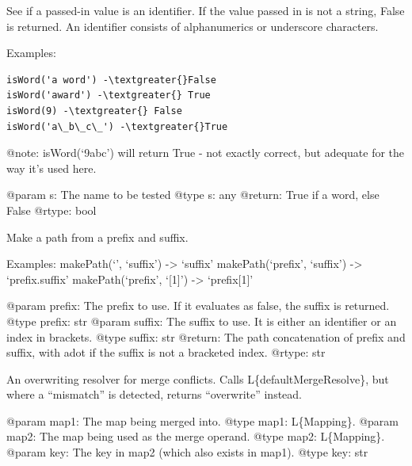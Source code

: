 \documentclass[a4paper,10pt,english]{sphinxmanual}
\begin{document}

\begin{fulllineitems}
\label{commands/apidoc/src:src.pyconf.isWord}
See if a passed-in value is an identifier. If the value passed in is not a
string, False is returned. An identifier consists of alphanumerics or
underscore characters.

Examples:

\begin{Verbatim}[commandchars=\\\{\}]
isWord('a word') -\textgreater{}False
isWord('award') -\textgreater{} True
isWord(9) -\textgreater{} False
isWord('a\_b\_c\_') -\textgreater{}True
\end{Verbatim}

@note: isWord(`9abc') will return True - not exactly correct, but adequate
for the way it's used here.

@param s: The name to be tested
@type s: any
@return: True if a word, else False
@rtype: bool

\end{fulllineitems}


\begin{fulllineitems}
\label{commands/apidoc/src:src.pyconf.makePath}
Make a path from a prefix and suffix.

Examples:
makePath(`', `suffix') -\textgreater{} `suffix'
makePath(`prefix', `suffix') -\textgreater{} `prefix.suffix'
makePath(`prefix', `{[}1{]}') -\textgreater{} `prefix{[}1{]}'

@param prefix: The prefix to use. If it evaluates as false, the suffix is returned.
@type prefix: str
@param suffix: The suffix to use. It is either an identifier or an index in brackets.
@type suffix: str
@return: The path concatenation of prefix and suffix, with adot if the suffix is not a bracketed index.
@rtype: str

\end{fulllineitems}


\begin{fulllineitems}
\label{commands/apidoc/src:src.pyconf.overwriteMergeResolve}
An overwriting resolver for merge conflicts. Calls L\{defaultMergeResolve\},
but where a ``mismatch'' is detected, returns ``overwrite'' instead.

@param map1: The map being merged into.
@type map1: L\{Mapping\}.
@param map2: The map being used as the merge operand.
@type map2: L\{Mapping\}.
@param key: The key in map2 (which also exists in map1).
@type key: str

\end{fulllineitems}
\end{document}
